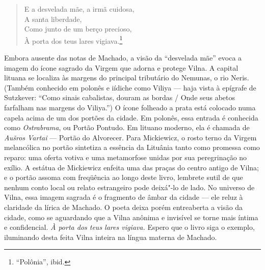 \begin{verse}
E a desvelada mãe, a irmã cuidosa,\\
\quad A santa liberdade,\\
Como junto de um berço precioso,\\
À porta dos teus lares vigiava.\footnote{``Polônia'', ibid.}
\end{verse}

Embora ausente das notas de Machado, a visão da ``desvelada mãe'' evoca
a imagem do ícone sagrado da Virgem que adorna e protege Vilna. A
capital lituana se localiza às margens do principal tributário do
Nemunas, o rio Neris. (Também conhecido em polonês e iídiche como Viliya
--- haja vista à epígrafe de Sutzkever: ``Como sinais cabalistas, douram
as bordas / Onde seus abetos farfalham nas margens do Viliya.'') O ícone
folheado a prata está colocado numa capela acima de um dos portões da
cidade. Em polonês, essa entrada é conhecida como \emph{Ostrabrama}, ou
Portão Pontudo. Em lituano moderno, ela é chamada de \emph{Aušros
Vartai} --- Portão do Alvorecer. Para Mickiewicz, o rosto terno da Virgem
melancólica no portão sintetiza a essência da Lituânia tanto como
promessa como reparo: uma oferta votiva e uma metamorfose unidas por sua
peregrinação no exílio. A estátua de Mickiewicz enfeita uma das praças
do centro antigo de Vilna; e o portão assoma com freqüência ao longo
deste livro, lembrete sutil de que nenhum conto local ou relato
estrangeiro pode deixá"-lo de lado. No universo de Vilna, essa imagem
sagrada é o fragmento de âmbar da cidade --- ele reluz à claridade da
lírica de Machado. O poeta deixa porém entreaberta a visão da cidade,
como se aguardando que a Vilna anônima e invisível se torne mais íntima
e confidencial. \emph{À porta dos teus lares vigiava.} Espero que o
livro siga o exemplo, iluminando desta feita Vilna inteira na língua
materna de Machado.

